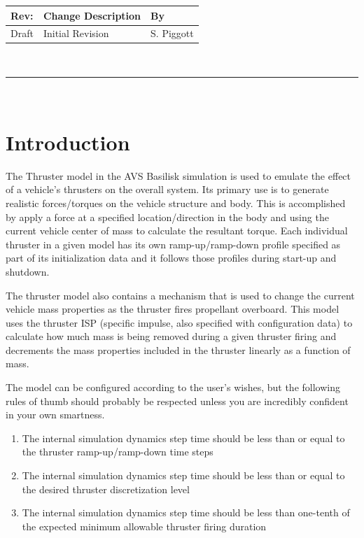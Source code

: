 \documentclass[]{LASPreport}
\begin{document}
\makeCover


%
%
\pagestyle{empty}
{\renewcommand{\arraystretch}{2}
\noindent
\begin{longtable}{|p{0.5in}|p{4.5in}|p{1.14in}|}
\hline
{\bfseries Rev}: & {\bfseries Change Description} & {\bfseries By} \\
\hline
Draft & Initial Revision & S. Piggott \\
\hline

\end{longtable}
}

\newpage
\setcounter{page}{1}
\pagestyle{fancy}

\tableofcontents
~\\ \hrule ~\\


\section{Introduction}
The Thruster model in the AVS Basilisk simulation is used to emulate the effect 
of a vehicle's thrusters on the overall system.  Its primary use is to generate 
realistic forces/torques on the vehicle structure and body.  This is 
accomplished by apply a force at a specified location/direction in the body and 
using the current vehicle center of mass to calculate the resultant torque.  
Each individual thruster in a given model has its own ramp-up/ramp-down profile 
specified as part of its initialization data and it follows those profiles during 
start-up and shutdown.

The thruster model also contains a mechanism that is used to change the current 
vehicle mass properties as the thruster fires propellant overboard.  This model 
uses the thruster ISP (specific impulse, also specified with configuration data) 
to calculate how much mass is being removed during a given thruster firing and 
decrements the mass properties included in the thruster linearly as a function 
of mass.  

The model can be configured according to the user's wishes, but the following 
rules of thumb should probably be respected unless you are incredibly confident 
in your own smartness.
\begin{enumerate}
\item{The internal simulation dynamics step time should be less than or equal 
     to the thruster ramp-up/ramp-down time steps}
\item{The internal simulation dynamics step time should be less than or equal to 
     the desired thruster discretization level}
\item{The internal simulation dynamics step time should be less than one-tenth 
    of the expected minimum allowable thruster firing duration}
\end{enumerate}
\end{document}
